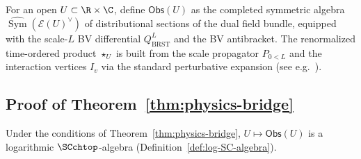 \begin{definition}
\label{def:local-obs}
For an open $U\subset \R\times\C$, define $\mathsf{Obs}(U)$ as the completed symmetric algebra $\widehat{\operatorname{Sym}}(\mathcal{E}(U)^\vee)$ of distributional sections of the dual field bundle, equipped with the scale-\(L\) BV differential \(Q_{\mathrm{BRST}}^L\) and the BV antibracket. The renormalized time-ordered product $\star_U$ is built from the scale propagator \(P_{0<L}\) and the interaction vertices \(I_v\) via the standard perturbative expansion (see e.g.\ \cite{CG17}).
\end{definition}

\subsection{Proof of Theorem~\ref{thm:physics-bridge}}
\label{subsec:analytic}

\begin{proposition}
\label{prop:prefact-Obs}
Under the conditions of Theorem~\ref{thm:physics-bridge}, $U\mapsto \mathsf{Obs}(U)$ is a logarithmic $\SCchtop$-algebra (Definition~\ref{def:log-SC-algebra}).
\end{proposition}

